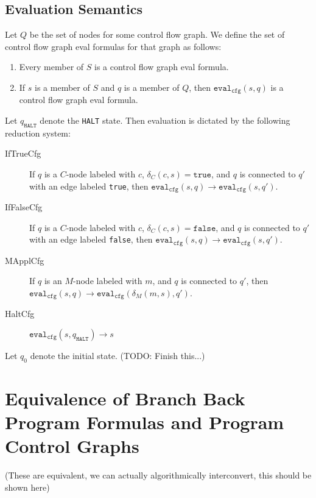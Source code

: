 \documentclass[11pt]{article}
\begin{document}
\subsection{Evaluation Semantics}

Let $Q$ be the set of nodes for some control flow graph.  We define the set of control flow graph eval formulas for that graph as follows:

\begin{enumerate}
\item Every member of $S$ is a control flow graph eval formula.
\item If $s$ is a member of $S$ and $q$ is a member of $Q$, then $\texttt{eval}_{\texttt{cfg}}(s, q)$ is a control flow graph eval formula.
\end{enumerate}

Let $q_{\texttt{HALT}}$ denote the \texttt{HALT} state.  Then evaluation is dictated by the following reduction system:

\begin{description}
\item[IfTrueCfg] If $q$ is a $C$-node labeled with $c$, $\delta_{C}(c, s) = \texttt{true}$, and $q$ is connected to $q'$ with an edge labeled \texttt{true}, then $\texttt{eval}_{\texttt{cfg}}(s, q) \longrightarrow \texttt{eval}_{\texttt{cfg}}(s, q')$.
\item[IfFalseCfg] If $q$ is a $C$-node labeled with $c$, $\delta_{C}(c, s) = \texttt{false}$, and $q$ is connected to $q'$ with an edge labeled \texttt{false}, then $\texttt{eval}_{\texttt{cfg}}(s, q) \longrightarrow \texttt{eval}_{\texttt{cfg}}(s, q')$.
\item[MApplCfg] If $q$ is an $M$-node labeled with $m$, and $q$ is connected to $q'$, then $\texttt{eval}_{\texttt{cfg}}(s, q) \longrightarrow \texttt{eval}_{\texttt{cfg}}(\delta_{M}(m, s), q')$.
\item[HaltCfg] $\texttt{eval}_{\texttt{cfg}}(s, q_{\texttt{HALT}}) \longrightarrow s$
\end{description}

Let $q_{0}$ denote the initial state.  (TODO: Finish this...)

\section{Equivalence of Branch Back Program Formulas and Program Control Graphs}

(These are equivalent, we can actually algorithmically interconvert, this should be shown here)
\end{document}
